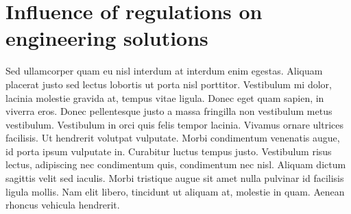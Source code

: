 \section{Influence of regulations on engineering solutions}

Sed ullamcorper quam eu nisl interdum at interdum enim egestas. Aliquam placerat justo sed lectus lobortis ut porta nisl porttitor. Vestibulum mi dolor, lacinia molestie gravida at, tempus vitae ligula. Donec eget quam sapien, in viverra eros. Donec pellentesque justo a massa fringilla non vestibulum metus vestibulum. Vestibulum in orci quis felis tempor lacinia. Vivamus ornare ultrices facilisis. Ut hendrerit volutpat vulputate. Morbi condimentum venenatis augue, id porta ipsum vulputate in. Curabitur luctus tempus justo. Vestibulum risus lectus, adipiscing nec condimentum quis, condimentum nec nisl. Aliquam dictum sagittis velit sed iaculis. Morbi tristique augue sit amet nulla pulvinar id facilisis ligula mollis. Nam elit libero, tincidunt ut aliquam at, molestie in quam. Aenean rhoncus vehicula hendrerit.